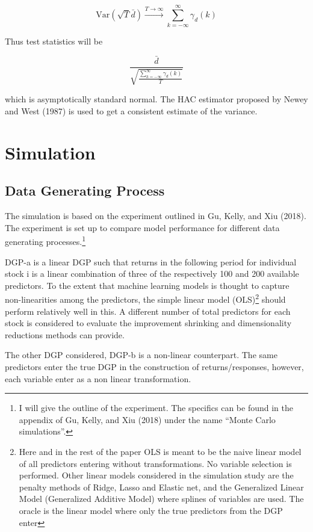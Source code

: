 \documentclass[]{article}
\let\rmarkdownfootnote\footnote%
\def\footnote{\protect\rmarkdownfootnote}
\begin{document}
\[\mathrm{Var}(\sqrt{T}\bar{d}) \xrightarrow[]{T\rightarrow \infty} \sum_{k=-\infty}^{\infty} \gamma_d(k)\]

Thus test statistics will be

\[\frac{\bar{d}}{\sqrt{ \frac{\sum_{k=-\infty}^{\infty} \gamma_d(k)}{T}  }}\]

which is asymptotically standard normal. The HAC estimator proposed by
Newey and West (1987) is used to get a consistent estimate of the
variance.

\hypertarget{simulation}{%
\section{Simulation}\label{simulation}}

\hypertarget{data-generating-process}{%
\subsection{Data Generating Process}\label{data-generating-process}}

The simulation is based on the experiment outlined in Gu, Kelly, and Xiu
(2018). The experiment is set up to compare model performance for
different data generating processes.\footnote{I will give the outline of
  the experiment. The specifics can be found in the appendix of Gu,
  Kelly, and Xiu (2018) under the name ``Monte Carlo simulations''.}

DGP-a is a linear DGP such that returns in the following period for
individual stock i is a linear combination of three of the respectively
100 and 200 available predictors. To the extent that machine learning
models is thought to capture non-linearities among the predictors, the
simple linear model (OLS)\footnote{Here and in the rest of the paper OLS
  is meant to be the naive linear model of all predictors entering
  without transformations. No variable selection is performed. Other
  linear models considered in the simulation study are the penalty
  methods of Ridge, Lasso and Elastic net, and the Generalized Linear
  Model (Generalized Additive Model) where splines of variables are
  used. The oracle is the linear model where only the true predictors
  from the DGP enter} should perform relatively well in this. A
different number of total predictors for each stock is considered to
evaluate the improvement shrinking and dimensionality reductions methods
can provide.

The other DGP considered, DGP-b is a non-linear counterpart. The same
predictors enter the true DGP in the construction of returns/responses,
however, each variable enter as a non linear transformation.
\end{document}
